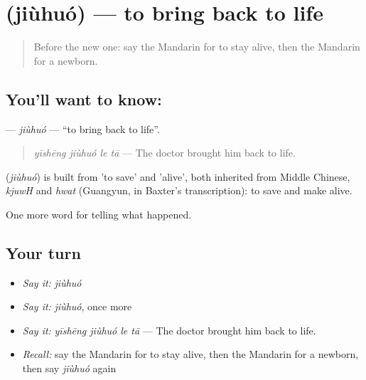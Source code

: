 \section[\texorpdfstring{\zh{救活} (jiùhuó)}{救活 (jiùhuó)}]{ (jiùhuó) — to bring back to life}

\label{lesson:ZH-C302-jiuhuo-revive}



\begin{quote}
Before the new one: say the Mandarin for to stay alive, then the Mandarin for a newborn.
\end{quote}

\subsection*{You'll want to know: }
\textbf{} — \emph{jiùhuó} — \textquotedblleft{}to bring back to life\textquotedblright{}.

\begin{quote}
\textbf{} \emph{yīshēng jiùhuó le tā} — The doctor brought him back to life.
\end{quote}

\begin{cousinweb}
\textbf{} (\emph{jiùhuó}) is built from  'to save' and  'alive', both inherited from Middle Chinese, \emph{kjuwH} and \emph{hwat} (Guangyun, in Baxter's transcription): to save and make alive.
\end{cousinweb}

\begin{grammarlens}[title={What you've built}]
One more word for telling what happened.
\end{grammarlens}

\subsection*{Your turn}
\begin{itemize}
\raggedright
  \item \emph{Say it:} \emph{jiùhuó}
  \item \emph{Say it:} \emph{jiùhuó}, once more
  \item \emph{Say it:} \emph{yīshēng jiùhuó le tā} — The doctor brought him back to life.
  \item \emph{Recall:} say the Mandarin for to stay alive, then the Mandarin for a newborn, then say \emph{jiùhuó} again
\end{itemize}

